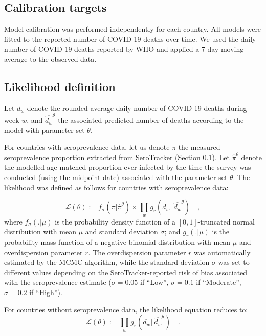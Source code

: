 \subsection{Calibration targets}
\label{targets}
Model calibration was performed independently for each country. All models were fitted to the reported number of COVID-19 deaths over time.
We used the daily number of COVID-19 deaths reported by WHO and applied a 7-day moving average to the observed data. 



\subsection{Likelihood definition}
\label{likelihood}
Let $d_w$ denote the rounded average daily number of COVID-19 deaths during week $w$, and $\hat{d_w}^\theta$ 
the associated predicted number of deaths according to the model with parameter set $\theta$. 

For countries with seroprevalence data, let us denote $\pi$ the measured seroprevalence proportion extracted from SeroTracker (Section \ref{targets}). 
Let $\hat{\pi}^\theta$ denote the modelled age-matched proportion ever infected by the time the survey was conducted (using the midpoint date) 
associated with the parameter set $\theta$. 
The likelihood was defined as follows for countries with seroprevalence data:

\begin{equation}
    \label{eq:likelihood}
    \mathcal{L}(\theta) := f_{\sigma}(\pi | \hat{\pi}^\theta) \times \prod_w g_r(d_w | \:\hat{d_w}^\theta) \quad ,
\end{equation}
where $f_{\sigma}( . | \mu )$ is the probability density function of a $[0, 1]$-truncated normal distribution with mean $\mu$ and standard deviation $\sigma$; and 
$g_r(. | \mu)$ is the probability mass function of a negative binomial distribution with mean $\mu$ and 
overdispersion parameter $r$. The overdispersion parameter $r$ was automatically estimated by the MCMC algorithm, while the standard deviation $\sigma$ was set to different 
values depending on the SeroTracker-reported risk of bias associated with the seroprevalence estimate ($\sigma=0.05$ if ``Low'', $\sigma=0.1$ if ``Moderate'', $\sigma=0.2$ if ``High''). 

For countries without seroprevalence data, the likelihood equation reduces to:
\begin{equation}
    \label{eq:likelihood_nosero}
    \mathcal{L}(\theta) := \prod_w g_r(d_w | \:\hat{d_w}^\theta) \quad.
\end{equation}

